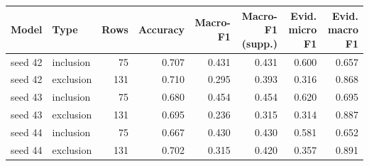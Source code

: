 \begin{tabular}{llrrrrrr}
\toprule
Model & Type & Rows & Accuracy & Macro-F1 & Macro-F1 (supp.) & Evid. micro F1 & Evid. macro F1 \\
\midrule
seed 42 & inclusion & 75 & 0.707 & 0.431 & 0.431 & 0.600 & 0.657 \\
seed 42 & exclusion & 131 & 0.710 & 0.295 & 0.393 & 0.316 & 0.868 \\
seed 43 & inclusion & 75 & 0.680 & 0.454 & 0.454 & 0.620 & 0.695 \\
seed 43 & exclusion & 131 & 0.695 & 0.236 & 0.315 & 0.314 & 0.887 \\
seed 44 & inclusion & 75 & 0.667 & 0.430 & 0.430 & 0.581 & 0.652 \\
seed 44 & exclusion & 131 & 0.702 & 0.315 & 0.420 & 0.357 & 0.891 \\
\bottomrule
\end{tabular}
